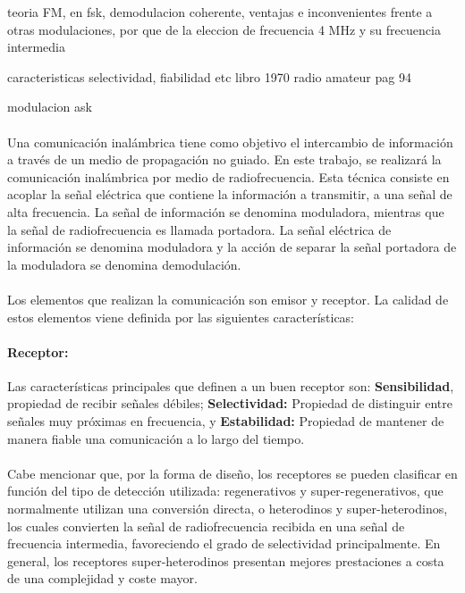 teoria FM, en fsk, demodulacion coherente, ventajas e inconvenientes frente a otras modulaciones, por que de la eleccion de frecuencia 4 MHz y su frecuencia intermedia

caracteristicas selectividad, fiabilidad etc libro 1970 radio amateur pag 94

modulacion ask

\paragraph{}
Una comunicación inalámbrica tiene como objetivo el intercambio de información a través de un medio de propagación no guiado.
En este trabajo, se realizará la comunicación inalámbrica por medio de radiofrecuencia. Esta técnica consiste en acoplar la señal eléctrica que contiene la información a transmitir, a una señal de alta frecuencia. La señal de información se denomina moduladora, mientras que la señal de radiofrecuencia es llamada portadora. La señal eléctrica de información se denomina moduladora y la acción de separar la señal portadora de la moduladora se denomina demodulación.
\paragraph{}
Los elementos que realizan la comunicación son emisor y receptor. La calidad de estos elementos viene definida por las siguientes características:
\paragraph{Receptor:}Las características principales que definen a un buen receptor son: \textbf{Sensibilidad}, propiedad de recibir señales débiles; \textbf{Selectividad:} Propiedad de distinguir entre señales muy próximas en frecuencia, y \textbf{Estabilidad:} Propiedad de mantener de manera fiable una comunicación a lo largo del tiempo.
\paragraph{}
Cabe mencionar que, por la forma de diseño, los receptores se pueden clasificar en función del tipo de detección utilizada: regenerativos y super-regenerativos, que normalmente utilizan una conversión directa, 
o heterodinos y super-heterodinos, los cuales convierten la señal de radiofrecuencia recibida en una señal de frecuencia intermedia, favoreciendo el grado de selectividad principalmente. En general, los receptores super-heterodinos presentan mejores prestaciones a costa de una complejidad y coste mayor.


